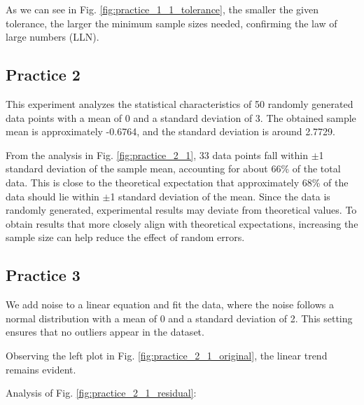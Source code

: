 \documentclass[12pt,a4paper]{article}
\begin{document}
\begin{CJK}{UTF8}{bkai}
As we can see in Fig. \ref{fig:practice_1_1_tolerance}, the smaller the given tolerance, the larger the minimum sample sizes needed, confirming the law of large numbers (LLN).

\subsection{Practice 2}
\hfill

This experiment analyzes the statistical characteristics of 50 randomly generated data points with a mean of 0 and a standard deviation of 3. The obtained sample mean is approximately -0.6764, and the standard deviation is around 2.7729.

From the analysis in Fig. \ref{fig:practice_2_1}, 33 data points fall within $\pm$1 standard deviation of the sample mean, accounting for about 66\% of the total data. This is close to the theoretical expectation that approximately 68\% of the data should lie within $\pm$1 standard deviation of the mean. Since the data is randomly generated, experimental results may deviate from theoretical values. To obtain results that more closely align with theoretical expectations, increasing the sample size can help reduce the effect of random errors.

\clearpage





\subsection{Practice 3}
\hfill

We add noise to a linear equation and fit the data, where the noise follows a normal distribution with a mean of 0 and a standard deviation of 2. This setting ensures that no outliers appear in the dataset.

Observing the left plot in Fig. \ref{fig:practice_2_1_original}, the linear trend remains evident.

Analysis of Fig. \ref{fig:practice_2_1_residual}:


\end{CJK}
\end{document}
